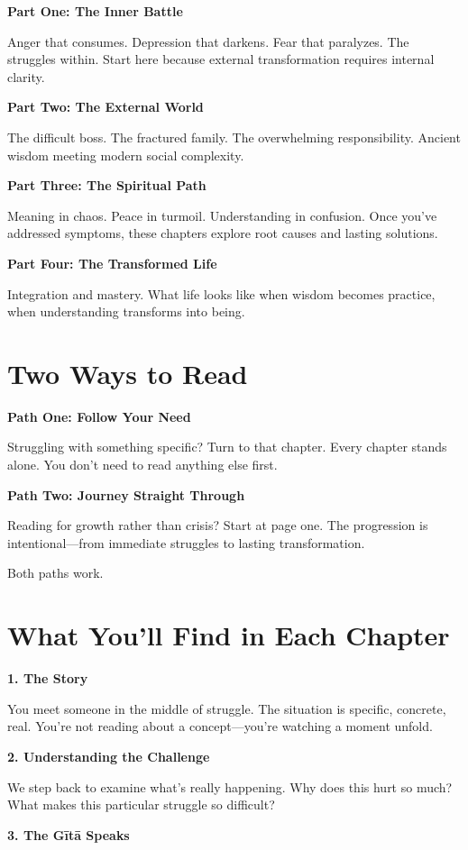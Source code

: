 \documentclass[11pt,twoside]{book}
\begin{document}
\textbf{Part One: The Inner Battle}

Anger that consumes. Depression that darkens. Fear that paralyzes. The struggles within. Start here because external transformation requires internal clarity.

\textbf{Part Two: The External World}

The difficult boss. The fractured family. The overwhelming responsibility. Ancient wisdom meeting modern social complexity.

\textbf{Part Three: The Spiritual Path}

Meaning in chaos. Peace in turmoil. Understanding in confusion. Once you've addressed symptoms, these chapters explore root causes and lasting solutions.

\textbf{Part Four: The Transformed Life}

Integration and mastery. What life looks like when wisdom becomes practice, when understanding transforms into being.

\section*{Two Ways to Read}

\textbf{Path One: Follow Your Need}

Struggling with something specific? Turn to that chapter. Every chapter stands alone. You don't need to read anything else first.

\textbf{Path Two: Journey Straight Through}

Reading for growth rather than crisis? Start at page one. The progression is intentional—from immediate struggles to lasting transformation.

Both paths work.

\section*{What You'll Find in Each Chapter}

\textbf{1. The Story}

You meet someone in the middle of struggle. The situation is specific, concrete, real. You're not reading about a concept—you're watching a moment unfold.

\textbf{2. Understanding the Challenge}

We step back to examine what's really happening. Why does this hurt so much? What makes this particular struggle so difficult?

\textbf{3. The Gītā Speaks}
\end{document}
